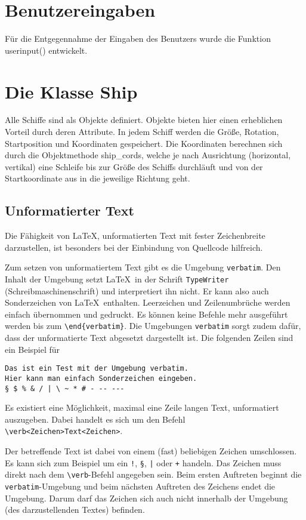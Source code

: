 \documentclass{llncs}
\begin{document}
\section{Benutzereingaben}

Für die Entgegennahme der Eingaben des Benutzers wurde die Funktion \glqq userinput()\grqq{} entwickelt.

\section{Die Klasse Ship}

Alle Schiffe sind als Objekte definiert. Objekte bieten hier einen erheblichen Vorteil durch deren Attribute.
In jedem Schiff werden die Größe, Rotation, Startposition und Koordinaten gespeichert. Die Koordinaten berechnen sich durch die Objektmethode \glqq ship_cords\grqq{},
welche je nach Ausrichtung (horizontal, vertikal) eine Schleife bis zur Größe des Schiffs durchläuft und von der Startkoordinate aus in die jeweilige Richtung geht.

\subsection{Unformatierter Text}
Die Fähigkeit von \LaTeX, unformatierten Text mit fester Zeichenbreite darzustellen, ist 
besonders bei der Einbindung von Quellcode hilfreich.

Zum setzen von unformatiertem Text gibt es die Umgebung \texttt{verbatim}. Den Inhalt der Umgebung setzt \LaTeX\ in der Schrift \texttt{TypeWriter} (Schreibmaschinenschrift) und interpretiert ihn nicht. Er kann also auch Sonderzeichen von \LaTeX\ enthalten. Leerzeichen und Zeilenumbrüche werden einfach übernommen und gedruckt. Es können keine Befehle mehr ausgeführt werden bis zum \verb!\end{verbatim}!. Die Umgebungen \texttt{verbatim} sorgt zudem dafür, dass der unformatierte Text abgesetzt dargestellt ist. Die folgenden Zeilen sind ein Beispiel für 

\begin{verbatim}
Das ist ein Test mit der Umgebung verbatim.
Hier kann man einfach Sonderzeichen eingeben.
§ $ % & / | \ ~ * # - -- ---
\end{verbatim}

Es existiert eine Möglichkeit, maximal eine Zeile langen Text, unformatiert auszugeben. Dabei handelt es sich um den Befehl \verb!\verb<Zeichen>Text<Zeichen>!.

Der betreffende Text ist dabei von einem (fast) beliebigen Zeichen umschlossen. Es kann sich zum Beispiel um ein \verb+!+, \verb!§!, \verb!|! oder \verb!+! handeln. Das Zeichen muss direkt nach dem \verb!\verb!-Befehl angegeben sein. Beim ersten Auftreten beginnt die \verb!verbatim!-Umgebung und beim nächsten Auftreten des Zeichens endet die Umgebung. Darum darf das Zeichen sich auch nicht innerhalb der Umgebung (des darzustellenden Textes) befinden.
\end{document}
